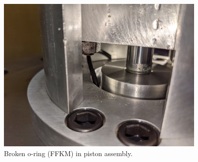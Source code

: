 \begin{figure}[htbp]
    \vspace{16pt}
    \centering
    \includegraphics[width=4.032in, height=3.024in]{design/photos/Piston_Broken_Oring.jpg}
    \caption{Broken o-ring (FFKM) in piston assembly.}
    \label{fig:broken oring piston}
    \vspace{16pt}
\end{figure}

    

